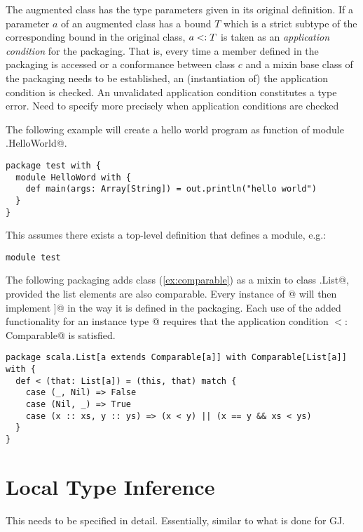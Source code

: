 \documentclass[11pt]{report}
\renewcommand{\todo}[1]{#1}
\begin{document}
\begin{itemize}
{The augmented class has the type parameters given in its original
definition. If a parameter $a$ of an augmented class has a bound $T$
which is a strict subtype of the corresponding bound in the original
class, $a <: T$ is taken as an {\em application condition} for
the packaging. That is, every time a member defined in the packaging
is accessed or a conformance between class $c$ and a mixin base class
of the packaging needs to be established, an (instantiation of) the
application condition is checked. An unvalidated application
condition constitutes a type error. \todo{Need to specify more
precisely when application conditions are checked}

\example The following example will create a hello world program as
function \verb@main@ of module \verb@test.HelloWorld@.
\begin{verbatim}
package test with {
  module HelloWord with {
    def main(args: Array[String]) = out.println("hello world")
  }
}
\end{verbatim}
This assumes there exists a top-level definition that defines a
\verb@test@ module, e.g.:
\begin{verbatim}
module test
\end{verbatim}

\example The following packaging adds class \verb@Comparable@
(\ref{ex:comparable}) as a mixin to class
\verb@scala.List@, provided the list elements are also comparable.
Every instance of \verb@List[$T$]@ will then implement
\verb@Comparable[List[$T$]]@ in the way it is defined in the
packaging. Each use of the added functionality for an instance type
\verb@List[$T$]@ requires that the application condition
\verb@T $<:$ Comparable@ is satisfied.
\begin{verbatim}
package scala.List[a extends Comparable[a]] with Comparable[List[a]] with {
  def < (that: List[a]) = (this, that) match {
    case (_, Nil) => False
    case (Nil, _) => True
    case (x :: xs, y :: ys) => (x < y) || (x == y && xs < ys)
  }
}
\end{verbatim}
}
\chapter{Local Type Inference}
\label{sec:local-type-inf}

This needs to be specified in detail.
Essentially, similar to what is done for GJ.

\end{itemize}
\end{document}
